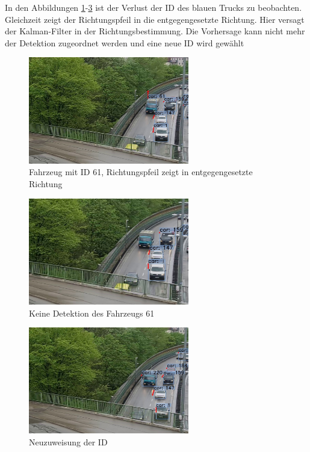 \documentclass[conference]{IEEEtran}
\begin{document}
	In den Abbildungen \ref{LLost1}-\ref{LLost3} ist der Verlust der ID des blauen Trucks zu
	beobachten. Gleichzeit zeigt der Richtungspfeil in die entgegengesetzte Richtung. Hier
	versagt der Kalman-Filter in der Richtungsbestimmung. Die Vorhersage kann nicht
	mehr der Detektion zugeordnet werden und eine neue ID wird gewählt
	
	\begin{figure}[!h]
		\begin{center}
			\includegraphics[width=7cm]{Media/LLost1.jpg}
			\caption{Fahrzeug mit ID 61, Richtungspfeil zeigt in entgegengesetzte Richtung}
			\label{LLost1}
		\end{center}
	\end{figure}
	\begin{figure}[!h]
		\begin{center}
			\includegraphics[width=7cm]{Media/LLost2.jpg}
			\caption{Keine Detektion des Fahrzeugs 61}
			\label{LLost2}
		\end{center}
	\end{figure}
	\begin{figure}[!h]
		\begin{center}
			\includegraphics[width=7cm]{Media/LLost3.jpg}
			\caption{Neuzuweisung der ID}
			\label{LLost3}
		\end{center}
	\end{figure}
	
\end{document}
